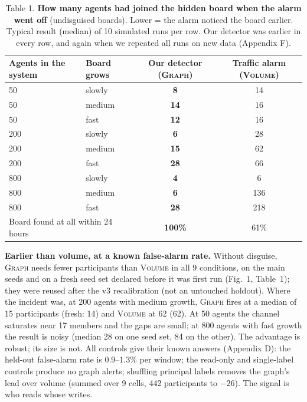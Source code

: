 \documentclass[10pt]{article}
\begin{document}
\begin{table}[t]
\centering\small
\caption{Table 1. \textbf{How many agents had joined the hidden board when the alarm went off} (undisguised boards). Lower = the alarm noticed the board earlier. Typical result (median) of 10 simulated runs per row. Our detector was earlier in every row, and again when we repeated all runs on new data (Appendix F).}
\begin{tabular}{llcc}
\toprule
Agents in the system & Board grows & Our detector (\textsc{Graph}) & Traffic alarm (\textsc{Volume})\\
\midrule
50  & slowly   & \textbf{8}  & 14\\
50  & medium   & \textbf{14} & 16\\
50  & fast     & \textbf{12} & 16\\
200 & slowly   & \textbf{6}  & 28\\
200 & medium   & \textbf{15} & 62\\
200 & fast     & \textbf{28} & 66\\
800 & slowly   & \textbf{4}  & 6\\
800 & medium   & \textbf{6}  & 136\\
800 & fast     & \textbf{28} & 218\\
\midrule
\multicolumn{2}{l}{Board found at all within 24 hours} & \textbf{100\%} & 61\%\\
\bottomrule
\end{tabular}
\end{table}

\textbf{Earlier than volume, at a known false-alarm rate.} Without disguise, \textsc{Graph} needs fewer participants than \textsc{Volume} in all 9 conditions, on the main seeds and on a fresh seed set declared before it was first run (Fig.~1, Table~1); they were reused after the v3 recalibration (not an untouched holdout). Where the incident was, at 200 agents with medium growth, \textsc{Graph} fires at a median of 15 participants (fresh: 14) and \textsc{Volume} at 62 (62). At 50 agents the channel saturates near 17 members and the gaps are small; at 800 agents with fast growth the result is noisy (median 28 on one seed set, 84 on the other). The advantage is robust; its size is not. All controls give their known answers (Appendix D): the held-out false-alarm rate is 0.9--1.3\% per window; the read-only and single-label controls produce no graph alerts; shuffling principal labels removes the graph's lead over volume (summed over 9 cells, 442 participants to $-26$). The signal is who reads whose writes.
\end{document}

